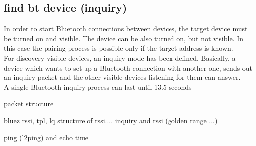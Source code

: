 \subsection{find bt device (inquiry)}
In order to start Bluetooth connections between devices, the target device must be turned on and visible. The device can be also turned on, but not visible. In this case the pairing process is possible only if the target address is known.\\
For discovery visible devices, an inquiry mode has been defined. Basically, a device which wants to set up a Bluetooth connection with another one, sends out an inquiry packet and the other visible devices listening for them can answer.\\
A single Bluetooth inquiry process can last until 13.5 seconds


packet structure

bluez
rssi, tpl, lq
structure of rssi....
inquiry and rssi (golden range ...)

ping (l2ping) and echo time